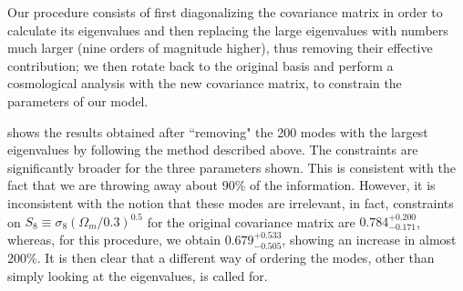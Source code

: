 \documentclass[twocolumn]{\docclass}
\newcommand\scott[1]{{\bf [Scott: #1]}}
\begin{document}
	Our procedure consists of first diagonalizing the covariance matrix in order to calculate its eigenvalues and then replacing the large eigenvalues with numbers much larger (nine orders of magnitude higher), thus removing their effective contribution; we then rotate back to the original basis and perform a cosmological analysis with the new covariance matrix, to constrain the parameters of our model. 
	
	 shows the results obtained after ``removing" the 200 modes with the largest eigenvalues by following the method described above.  The constraints are significantly broader for the three parameters shown. This is consistent with the fact that we are throwing away about 90\% of the information. However, it is inconsistent with the notion that these modes are irrelevant, in fact, constraints on $S_8\equiv \sigma_8 (\Omega_m/0.3)^{0.5}$ for the original covariance matrix are $0.784^{+ 0.200}_{- 0.171}$, whereas, for this procedure, we obtain $0.679^{+ 0.533}_{- 0.505}$, showing an increase in almost 200\%. It is then clear that a different way of ordering the modes, other than simply looking at the eigenvalues, is called for.	
	
	
	
	
\end{document}
